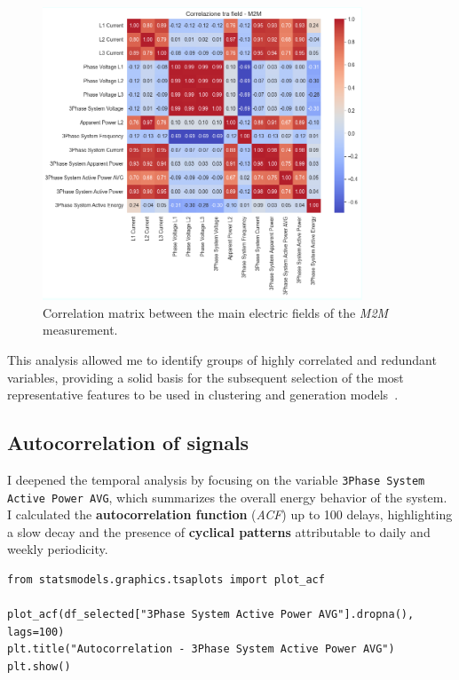 \begin{figure}[H]
\centering
\includegraphics[width=0.85\textwidth]{images/matr_corr.png}
\caption{Correlation matrix between the main electric fields of the \emph{M2M} measurement.}
\label{fig:m2m_heatmap}
\end{figure}

This analysis allowed me to identify groups of highly correlated and redundant variables, providing a solid basis for the subsequent selection of the most representative features to be used in clustering and generation models~\cite{bishop2006pattern,han2011data,hastie2009elements,pearson1895correlation}.

\subsection{Autocorrelation of signals}

I deepened the temporal analysis by focusing on the variable \texttt{3Phase System Active Power AVG}, which summarizes the overall energy behavior of the system.  
I calculated the \textbf{autocorrelation function} (\emph{ACF}) up to 100 delays, highlighting a slow decay and the presence of \textbf{cyclical patterns} attributable to daily and weekly periodicity.

\begin{listing}[H]
\begin{verbatim}
from statsmodels.graphics.tsaplots import plot_acf

plot_acf(df_selected["3Phase System Active Power AVG"].dropna(), lags=100)
plt.title("Autocorrelation - 3Phase System Active Power AVG")
plt.show()
\end{verbatim}
\end{listing}

